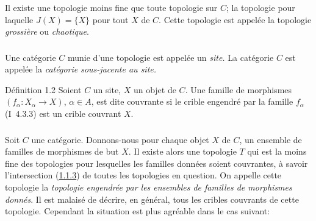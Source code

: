 \documentclass[10pt]{../fichiers-configuration-latex/smfart}
\begin{document}
Il existe une topologie moins fine que toute topologie sur $C$; la
topologie pour laquelle $J(X)=\{X\}$ pour tout $X$ de $C$. Cette
topologie est appelée la topologie \emph{grossière} ou
\emph{chaotique}.

\subsubsection{}
Une catégorie $C$ munie d'une topologie est appelée un \emph{site.}
La catégorie $C$ est appelée la \emph{catégorie
  sous-jacente au site.}

\begin{enonce*}{Définition 1.2}
Soient $C$ un site, $X$ un objet de $C$. Une famille de morphismes
$(f_{\alpha}:X_{\alpha}\rightarrow X)$, $\alpha\in A$, est dite
couvrante si le crible engendré par la famille $f_{\alpha}$
{\rm(I~4.3.3)} est un crible couvrant $X$.
\end{enonce*}

\subsubsection{}
Soit $C$ une catégorie. Donnons-nous pour chaque objet $X$ de $C$,
un ensemble de familles de morphismes de but $X$. Il existe alors
une topologie $T$ qui est la moins fine des topologies pour
lesquelles les familles données soient couvrantes, à savoir
l'intersection (\hyperref[II.subsubsec1.1.3]{1.1.3}) de toutes les topologies en
question. On appelle cette topologie la \emph{topologie engendrée
par les ensembles de familles
  de morphismes donnés}. Il est malaisé de décrire, en
général, tous les cribles couvrants de cette topologie.
Cependant la situation est plus agréable dans le cas suivant:
\end{document}
